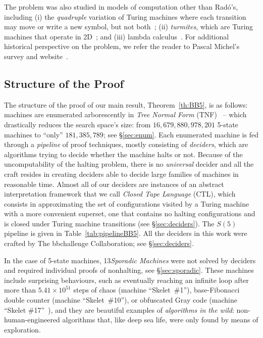 \documentclass[sigconf,screen]{acmart}
\theoremstyle{definition} %
\numberwithin{equation}{section}
\theoremstyle{definition} %
\newcommand{\BBtheFifthTNF}{181{,}385{,}789}
\newcommand{\rado}{Rad\'o\xspace}
\newcommand{\numSporadic}{13\xspace}
\begin{document}
The \BBfull problem was also studied in models of computation other than \rado's, including (i) the \textit{quadruple} variation of Turing machines where each transition may move or write a new symbol, but not both~\cite{Ross2003,Ross2005}; (ii) \textit{turmites}, which are Turing machines that operate in 2D~\cite{BradyMeaningOfLife}; and (iii) lambda calculus~\cite{tromp_oeis}.  For additional historical perspective on the \BBfull problem, we refer the reader to Pascal Michel's survey and website~\cite{michel2019busy,PMichel_website}.

\subsection{Structure of the Proof}\label{sec:intro:structure}

The structure of the proof of our main result, Theorem~\ref{th:BB5}, is as follows: machines are enumerated arborescently in \textit{Tree Normal Form} (TNF)~\cite{Brady64} -- which drastically reduces the search space's size: from $16{,}679{,}880{,}978{,}201$ 5-state machines to ``only'' $\BBtheFifthTNF$; see \S\ref{sec:enum}. Each enumerated machine is fed through a \textit{pipeline} of proof techniques, mostly consisting of \textit{deciders}, which are algorithms trying to decide whether the machine halts or not. Because of the uncomputability of the halting problem, there is no \textit{universal} decider and all the craft resides in creating deciders able to decide large families of machines in reasonable time. Almost all of our deciders are instances of an abstract interpretation framework that we call \textit{Closed Tape Language} (CTL), which consists in approximating the set of configurations visited by a Turing machine with a more convenient superset, one that contains no halting configurations and is closed under Turing machine transitions (see \S\ref{sec:deciders}). The $S(5)$ pipeline is given in Table~\ref{tab:pipelineBB5}. All the deciders in this work were crafted by The bbchallenge Collaboration; see \S\ref{sec:deciders}.

In the case of 5-state machines, \numSporadic \textit{Sporadic Machines} were not solved by deciders and required individual proofs of nonhalting, see \S\ref{sec:sporadic}. These machines include surprising behaviours, such as eventually reaching an infinite loop after more than $5.41\times10^{51}$ steps of chaos (machine ``Skelet~\#1''), base-Fibonacci double counter (machine ``Skelet~\#10''), or obfuscated Gray code (machine ``Skelet \#17''~\cite{xu2024skelet17fifthbusy}), and they are beautiful examples of \textit{algorithms in the wild}: non-human-engineered algorithms that, like deep sea life, were only found by means of exploration. 
\end{document}
